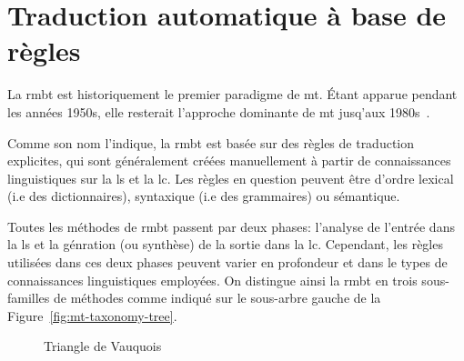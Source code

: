 \section{Traduction automatique à base de règles}
\label{sec:rbmt}

La \acrfull{rmbt} est historiquement le premier paradigme de \acrshort{mt}. 
Étant apparue pendant les années 1950s, 
elle resterait l'approche dominante de \acrshort{mt} jusq'aux 1980s~\cite{routledge}.

Comme son nom l'indique, la \acrshort{rmbt} est basée sur des règles de traduction explicites,
qui sont généralement créées manuellement à partir de connaissances linguistiques sur la \acrfull{ls} et la \acrfull{lc}. 
Les règles en question peuvent être d'ordre lexical (i.e des dictionnaires),
syntaxique (i.e des grammaires) ou sémantique.

Toutes les méthodes de \acrshort{rmbt} passent par deux phases: 
l'analyse de l'entrée dans la \acrshort{ls} 
et la génration (ou synthèse) de la sortie dans la \acrshort{lc}. 
Cependant, les règles utilisées dans ces deux phases peuvent varier en profondeur
et dans le types de connaissances linguistiques employées. 
On distingue ainsi la \acrshort{rmbt} en trois sous-familles de méthodes comme indiqué 
sur le sous-arbre gauche de la Figure~\ref{fig:mt-taxonomy-tree}.

\begin{figure}[h]
    \begin{center}
        
    \end{center}
    \caption{Triangle de Vauquois}
    \label{fig:vauquois-triangle}
\end{figure}


